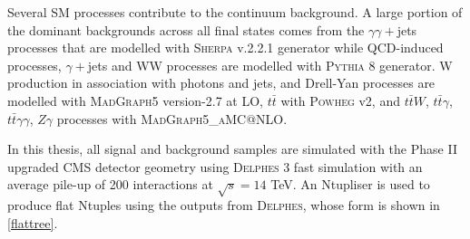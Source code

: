 {Several SM processes contribute to the continuum background. A large portion of the dominant backgrounds across all final states comes from the $\gamma\gamma+$jets processes that are modelled with \textsc{Sherpa} v.2.2.1 generator \cite{10.21468/SciPostPhys.7.3.034} while QCD-induced processes, $\gamma+$jets and WW processes are modelled with \textsc{Pythia} 8 generator. W production in association with photons and jets, and Drell-Yan processes are modelled with \textsc{MadGraph5} version-2.7 at LO, $t\bar t$ with \textsc{Powheg} v2, and $t\bar tW$, $t\bar t\gamma$, $t\bar t\gamma\gamma$, $Z\gamma$ processes with \textsc{MadGraph5\_aMC@NLO}.

In this thesis, all signal and background samples are simulated with the Phase II upgraded CMS detector geometry using \textsc{Delphes} 3 fast simulation \cite{Selvaggi:2014mya} with an average pile-up of 200 interactions at $\sqrt{s}=14$ TeV. An Ntupliser is used to produce flat Ntuples using the outputs from \textsc{Delphes}, whose form is shown in \autoref{flattree}.

}
